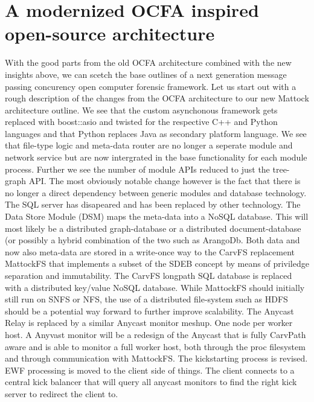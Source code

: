 \section{A modernized OCFA inspired open-source architecture}
With the good parts from the old OCFA architecture combined with the new insights above, we can scetch the base outlines of a next generation message passing concurency open computer forensic framework. Let us start out with a rough description of the changes from the OCFA architecture to our new Mattock architecture outline. We see that the custom asynchonous framework gets replaced with boost::asio and twisted for the respective C++ and Python languages and that Python replaces Java as secondary platform language. We see that file-type logic and meta-data router are no longer a seperate module and network service but are now intergrated in the base functionality for each module process. Further we see the number of module APIs reduced to just the tree-graph API. The most obviously notable change however is the fact that there is no longer a direct dependency between generic modules and database technology. The SQL server has disapeared and has been replaced by other technology. The Data Store Module (DSM) maps the meta-data into a NoSQL database. This will most likely be a distributed graph-database or a distributed document-database (or possibly a hybrid combination of the two such as ArangoDb. Both data and now also meta-data are stored in a write-once way to the CarvFS replacement MattockFS that implements a subset of the SDEB concept by means of priviledge separation and immutability. The CarvFS longpath SQL database is replaced with a distributed key/value NoSQL database. While MattockFS should initially still run on SNFS or NFS, the use of a distributed file-system such as HDFS should be a potential way forward to further improve scalability. The Anycast Relay is replaced by a similar Anycast monitor meshup. One node per worker host. A Anyvast monitor will be a redesign of the Anycast that is fully CarvPath aware and is able to monitor a full worker host, both through the proc filesystem and through communication with MattockFS. The kickstarting process is revised. EWF processing is moved to the client side of things. The client connects to a central kick balancer that will query all anycast monitors to find the right kick server to redirect the client to. 
